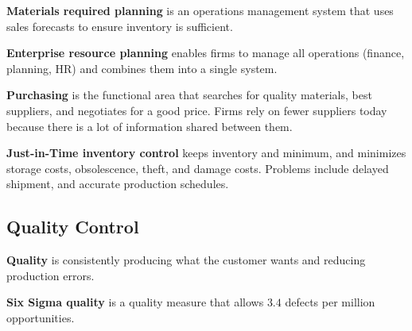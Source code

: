 \documentclass[english, 12pt]{article}
\begin{document}
\begin{defn}
\textbf{Materials required planning} is an operations management system that uses sales forecasts to ensure inventory is sufficient.
\end{defn}
\begin{defn}
\textbf{Enterprise resource planning} enables firms to manage all operations (finance, planning, HR) and combines them into a single system.
\end{defn}
\begin{defn}
\textbf{Purchasing} is the functional area that searches for quality materials, best suppliers, and negotiates for a good price. Firms rely on fewer suppliers today because there is a lot of information shared between them.
\end{defn}
\begin{defn}[JIT]
\textbf{Just-in-Time inventory control} keeps inventory and minimum, and minimizes storage costs, obsolescence, theft, and damage costs. Problems include delayed shipment, and accurate production schedules.
\end{defn}
\subsection{Quality Control}
\begin{defn}
\textbf{Quality} is consistently producing what the customer wants and reducing production errors.
\end{defn}
\begin{defn}
\textbf{Six Sigma quality} is a quality measure that allows $3.4$ defects per million opportunities.
\end{defn}
\end{document}
